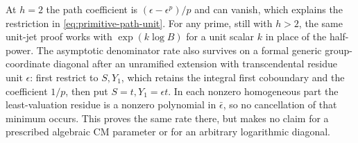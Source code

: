 At $h=2$ the path coefficient is $(\epsilon-\epsilon^p)/p$ and can vanish, which explains the restriction in \eqref{eq:primitive-path-unit}. For any prime, still with $h>2$, the same unit-jet proof works with $\exp(k\log B)$ for a unit scalar $k$ in place of the half-power. The asymptotic denominator rate also survives on a formal generic group-coordinate diagonal after an unramified extension with transcendental residue unit $\epsilon$: first restrict to $S,Y_1$, which retains the integral first coboundary and the coefficient $1/p$, then put $S=t,Y_1=\epsilon t$. In each nonzero homogeneous part the least-valuation residue is a nonzero polynomial in $\bar\epsilon$, so no cancellation of that minimum occurs. This proves the same rate there, but makes no claim for a prescribed algebraic CM parameter or for an arbitrary logarithmic diagonal.

